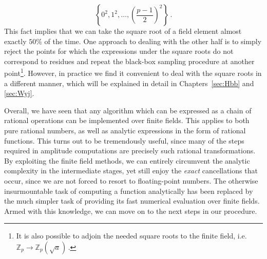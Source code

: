 \documentclass[main.tex]{subfiles}
\begin{document}
\begin{equation}
    \left\{0^2, 1^2, \ldots, \left(\frac{p-1}{2}\right)^2  \right\}\,.
\end{equation}
This fact implies that we can take the square root of a field element almost exactly $50\%$ of the time. One approach to dealing with the other half is to simply reject the points for which the expressions under the square roots
do not correspond to residues and repeat the black-box sampling procedure at another point\footnote{It is also possible to adjoin the needed square roots to the finite field, i.e. $\mathbb{Z}_p \rightarrow \mathbb{Z}_p \left( \sqrt{a} \right)$\,.}. However, in practice we find it convenient to deal with the square roots in a different manner, which will be explained in detail in Chapters~\ref{sec:Hbb} and \ref{sec:Wyj}.

Overall, we have seen that any algorithm which can be expressed as a chain of rational operations can be implemented over finite fields. This applies to both pure rational numbers, as well as analytic expressions in the form of rational functions. This turns out to be tremendously useful, since many of the steps required in amplitude computations are precisely such rational transformations. By exploiting the finite field methods, we can entirely circumvent the analytic complexity in the intermediate stages, yet still enjoy the \textit{exact} cancellations that occur, since we are not forced to resort to floating-point numbers. The otherwise insurmountable task of computing a function analytically has been replaced by the much simpler task of providing its fast numerical evaluation over finite fields. Armed with this knowledge, we can move on to the next steps in our procedure.
\end{document}
